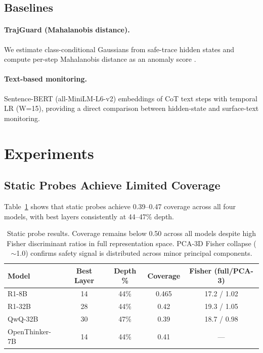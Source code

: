 \documentclass[11pt,a4paper]{article}
\begin{document}
\subsection{Baselines}

\paragraph{TrajGuard (Mahalanobis distance).} We estimate class-conditional Gaussians from safe-trace hidden states and compute per-step Mahalanobis distance as an anomaly score \cite{zou2024improving}.

\paragraph{Text-based monitoring.} Sentence-BERT (all-MiniLM-L6-v2) embeddings of CoT text steps with temporal LR (W=15), providing a direct comparison between hidden-state and surface-text monitoring.

\section{Experiments}
\label{sec:experiments}

\subsection{Static Probes Achieve Limited Coverage}
\label{sec:exp-static}

Table~\ref{tab:static} shows that static probes achieve 0.39--0.47 coverage across all four models, with best layers consistently at 44--47\% depth.

\begin{table}[t]
\centering
\small
\begin{tabular}{lcccc}
\toprule
\textbf{Model} & \textbf{Best Layer} & \textbf{Depth \%} & \textbf{Coverage} & \textbf{Fisher (full/PCA-3)} \\
\midrule
R1-8B & 14 & 44\% & 0.465 & 17.2 / 1.02 \\
R1-32B & 28 & 44\% & 0.42 & 19.3 / 1.05 \\
QwQ-32B & 30 & 47\% & 0.39 & 18.7 / 0.98 \\
OpenThinker-7B & 14 & 44\% & 0.41 & --- \\
\bottomrule
\end{tabular}
\caption{Static probe results. Coverage remains below 0.50 across all models despite high Fisher discriminant ratios in full representation space. PCA-3D Fisher collapse ($\sim$1.0) confirms safety signal is distributed across minor principal components.}
\label{tab:static}
\end{table}
\end{document}
